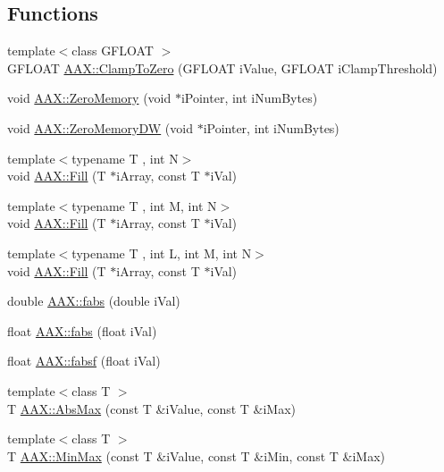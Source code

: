 \subsection*{Functions}
\begin{DoxyCompactItemize}
\item 
{\footnotesize template$<$class G\+F\+L\+O\+A\+T $>$ }\\G\+F\+L\+O\+A\+T \hyperlink{a00288_a6b1f85f5d8c5837ff52212e13b84e6d0}{A\+A\+X\+::\+Clamp\+To\+Zero} (G\+F\+L\+O\+A\+T i\+Value, G\+F\+L\+O\+A\+T i\+Clamp\+Threshold)
\item 
void \hyperlink{a00288_ae9c9b3862c1b63dc4fb4e3c901d42935}{A\+A\+X\+::\+Zero\+Memory} (void $\ast$i\+Pointer, int i\+Num\+Bytes)
\item 
void \hyperlink{a00288_a0e598e79488a12354e9dbc340fa99b5a}{A\+A\+X\+::\+Zero\+Memory\+D\+W} (void $\ast$i\+Pointer, int i\+Num\+Bytes)
\item 
{\footnotesize template$<$typename T , int N$>$ }\\void \hyperlink{a00288_a1e72222769ecdf34fa73ae38c0c709df}{A\+A\+X\+::\+Fill} (T $\ast$i\+Array, const T $\ast$i\+Val)
\item 
{\footnotesize template$<$typename T , int M, int N$>$ }\\void \hyperlink{a00288_a480beff32ac0847c665f735fd8f78c0a}{A\+A\+X\+::\+Fill} (T $\ast$i\+Array, const T $\ast$i\+Val)
\item 
{\footnotesize template$<$typename T , int L, int M, int N$>$ }\\void \hyperlink{a00288_a114e6f06cf5789da4aad7ae0d786876e}{A\+A\+X\+::\+Fill} (T $\ast$i\+Array, const T $\ast$i\+Val)
\item 
double \hyperlink{a00288_aa4fa4d0765a764b020102cdbff8b45b0}{A\+A\+X\+::fabs} (double i\+Val)
\item 
float \hyperlink{a00288_af486dfb226661e4a47d7b42eca881759}{A\+A\+X\+::fabs} (float i\+Val)
\item 
float \hyperlink{a00288_a7fc4d4cd59850b8b875d085467ff5850}{A\+A\+X\+::fabsf} (float i\+Val)
\item 
{\footnotesize template$<$class T $>$ }\\T \hyperlink{a00288_aa4cbb7d8707ad89fc5ba5169ebb75201}{A\+A\+X\+::\+Abs\+Max} (const T \&i\+Value, const T \&i\+Max)
\item 
{\footnotesize template$<$class T $>$ }\\T \hyperlink{a00288_aca59c4cdf56130ee251118c02a9963e3}{A\+A\+X\+::\+Min\+Max} (const T \&i\+Value, const T \&i\+Min, const T \&i\+Max)

\end{DoxyCompactItemize}
